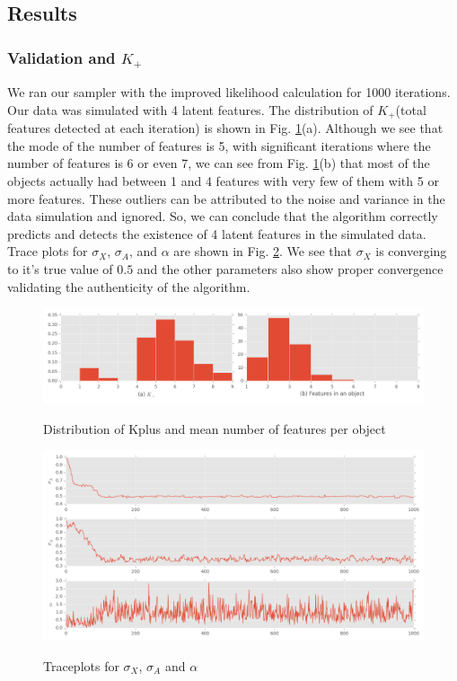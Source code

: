 \documentclass{article}
\begin{document}
\subsection{Results}
\subsubsection{Validation and $K_+$}
We ran our sampler with the improved likelihood calculation for 1000 iterations. Our data was simulated with 4 latent features. The distribution of $K_+$(total features detected at each iteration) is shown in Fig. \ref{fig:dist}(a). Although we see that the mode of the number of features is 5, with significant iterations where the number of features is 6 or even 7, we can see from Fig. \ref{fig:dist}(b) that most of the objects actually had between 1 and 4 features with very few of them with 5 or more features. These outliers can be attributed to the noise and variance in the data simulation and ignored. So, we can conclude that the algorithm correctly predicts and detects the existence of 4 latent features in the simulated data.\\
Trace plots for $\sigma_X$, $\sigma_A$, and $\alpha$ are shown in Fig. \ref{fig:trace}. We see that $\sigma_X$ is converging to it's true value of $0.5$ and the other parameters also show proper convergence validating the authenticity of the algorithm.\\ 
\begin{figure}[ht]
\caption {Distribution of Kplus and mean number of features per object}
\includegraphics[width=\linewidth]{figures/kDistribution.png}
\label{fig:dist}
\end{figure}

\begin{figure}[ht]
\caption {Traceplots for $\sigma_X$, $\sigma_A$ and $\alpha$}
\includegraphics[width=\linewidth]{figures/Trace.png}
\label{fig:trace}
\end{figure}
\end{document}
